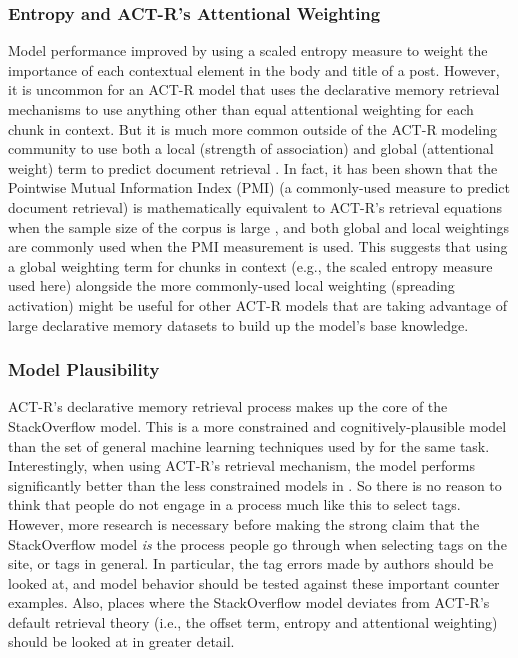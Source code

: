\documentclass[10pt,letterpaper]{article}
\begin{document}
\subsubsection{Entropy and ACT-R's Attentional Weighting}

Model performance improved by using a scaled entropy measure to weight the importance of each contextual element in the body and title of a post.
However, it is uncommon for an ACT-R model that uses the declarative memory retrieval mechanisms to use anything other than equal attentional weighting for each chunk in context.
But it is much more common outside of the ACT-R modeling community to use both a local (strength of association) and global (attentional weight) term to predict document retrieval \cite{Dumais1991}.
In fact, it has been shown that the Pointwise Mutual Information Index (PMI) (a commonly-used measure to predict document retrieval)
is mathematically equivalent to ACT-R's retrieval equations when the sample size of the corpus is large \cite{Budiu2007, Farahat2004},
and both global and local weightings are commonly used when the PMI measurement is used.
This suggests that using a global weighting term for chunks in context (e.g., the scaled entropy measure used here)
alongside the more commonly-used local weighting (spreading activation) might be useful for other ACT-R models that are taking advantage of large declarative memory datasets to build up the model's base knowledge.

\subsubsection{Model Plausibility}

ACT-R's declarative memory retrieval process makes up the core of the StackOverflow model.
This is a more constrained and cognitively-plausible model than the set of general machine learning techniques used by  for the same task. 
Interestingly, when using ACT-R's retrieval mechanism, the model performs significantly better than the less constrained models in .
So there is no reason to think that people do not engage in a process much like this to select tags.
However, more research is necessary before making the strong claim that the StackOverflow model \emph{is} the process people go through when selecting tags on the site, or tags in general.
In particular, the tag errors made by authors should be looked at, and model behavior should be tested against these important counter examples.
Also, places where the StackOverflow model deviates from ACT-R's default retrieval theory (i.e., the offset term, entropy and attentional weighting) should be looked at in greater detail.
\end{document}
